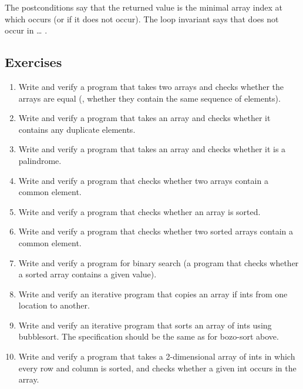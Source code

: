 \noindent
The postconditions say that the returned value is the minimal array
index at which  occurs (or  if it does not occur).
The loop invariant says that   does not occur in \dots
{}.

\subsection*{Exercises}
\begin{enumerate}
\item
Write and verify a program that takes two arrays and checks whether
the arrays are equal (\ie, whether they contain the same sequence of
elements).
\item
Write and verify a program that takes an array and checks whether it
contains any duplicate elements.
\item
Write and verify a program that takes an array and checks whether it
is a palindrome.
\item
Write and verify a program that checks whether two arrays contain a
common element.
\item
Write and verify a program that checks whether an array is sorted.
\item
Write and verify a program that checks whether two sorted arrays
contain a common element.
\item
Write and verify a program for binary search (a program
that checks whether a sorted array contains a given value).
\item
Write and verify an iterative program that copies an array if ints from one
location to another.%
\item
Write and verify an iterative program that sorts an array of ints using
bubblesort. The specification should be the same as for bozo-sort above.
\item 
Write and verify a program that takes a 2-dimensional array of ints in
which every row and column is sorted, and checks whether a given int
occurs in the array.
\end{enumerate}


%

